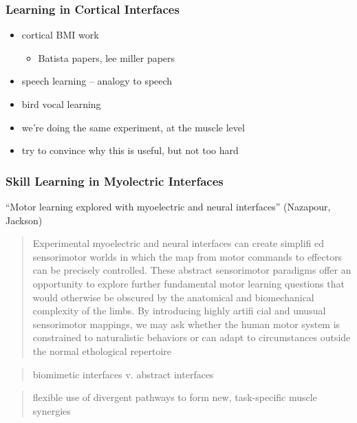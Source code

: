 \subsubsection{Learning in Cortical
Interfaces}\label{learning-in-cortical-interfaces}

\begin{itemize}
\item
  cortical BMI work

  \begin{itemize}
  \tightlist
  \item
    Batista papers, lee miller papers
  \end{itemize}
\item
  speech learning -- analogy to speech
\item
  bird vocal learning
\item
  we're doing the same experiment, at the muscle level
\item
  try to convince why this is useful, but not too hard
\end{itemize}

\subsubsection{Skill Learning in Myolectric
Interfaces}\label{skill-learning-in-myolectric-interfaces}

``Motor learning explored with myoelectric and neural interfaces''
(Nazapour, Jackson)

\begin{quote}
Experimental myoelectric and neural interfaces can create simplifi ed
sensorimotor worlds in which the map from motor commands to effectors
can be precisely controlled. These abstract sensorimotor paradigms offer
an opportunity to explore further fundamental motor learning questions
that would otherwise be obscured by the anatomical and biomechanical
complexity of the limbs. By introducing highly artifi cial and unusual
sensorimotor mappings, we may ask whether the human motor system is
constrained to naturalistic behaviors or can adapt to circumstances
outside the normal ethological repertoire
\end{quote}

\begin{quote}
biomimetic interfaces v. abstract interfaces
\end{quote}

\begin{quote}
flexible use of divergent pathways to form new, task-specific muscle
synergies
\end{quote}

